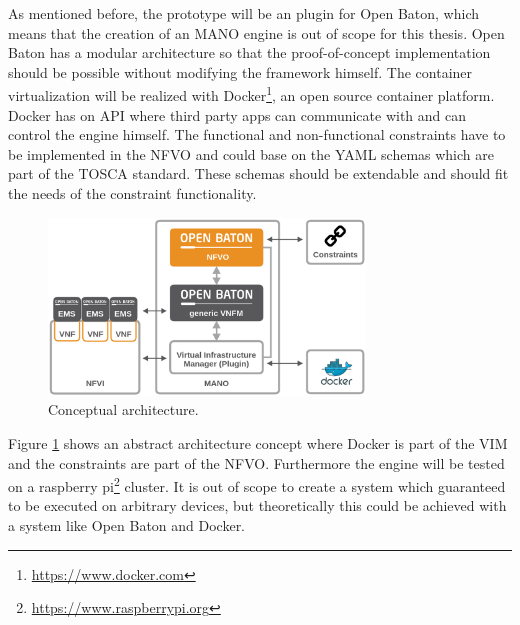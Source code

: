 As mentioned before, the prototype will be an plugin for Open Baton, which means that the creation of an \ac{MANO} engine is out of scope for this thesis.
Open Baton has a modular architecture so that the proof-of-concept implementation should be possible without modifying the framework himself.
The container virtualization will be realized with Docker\footnote{\url{https://www.docker.com}}, an open source container platform.
Docker has on \ac{API} where third party apps can communicate with and can control the engine himself.
The functional and non-functional constraints have to be implemented in the \ac{NFVO} and could base on the \ac{YAML} schemas which are part of the \ac{TOSCA} standard.
These schemas should be extendable and should fit the needs of the constraint functionality.

\begin{figure}[H]
    \centering
    \includegraphics[width=0.75\textwidth]{resources/images/architecture.png}
    \caption[Conceptual architecture]{Conceptual architecture.}
    \label{fig:conceptual_architecture}
\end{figure}

Figure \ref{fig:conceptual_architecture} shows an abstract architecture concept where Docker is part of the \ac{VIM} and the constraints are part of the \ac{NFVO}.
Furthermore the engine will be tested on a raspberry pi\footnote{\url{https://www.raspberrypi.org}} cluster.
It is out of scope to create a system which guaranteed to be executed on arbitrary devices, but theoretically this could be achieved with a system like Open Baton and Docker.


